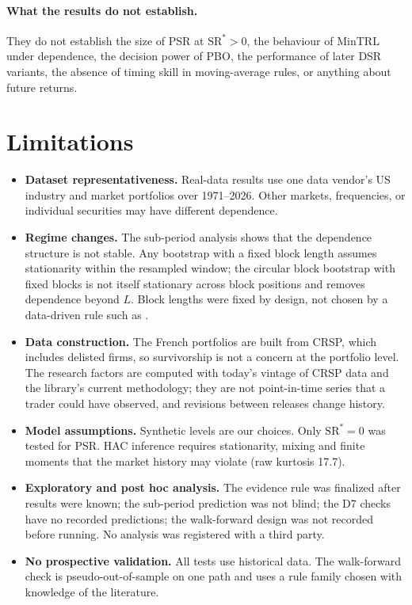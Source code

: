 \documentclass[11pt,a4paper]{article}
\newcommand{\SR}{\mathrm{SR}}
\theoremstyle{remark}
\begin{document}
\paragraph{What the results do not establish.} They do not establish the size of PSR at $\SR^\ast>0$, the behaviour of MinTRL under dependence, the decision power of PBO, the performance of later DSR variants, the absence of timing skill in moving-average rules, or anything about future returns.

\section{Limitations}\label{sec:limits}

\begin{itemize}
\item \textbf{Dataset representativeness.} Real-data results use one data vendor's US industry and market portfolios over 1971--2026. Other markets, frequencies, or individual securities may have different dependence.
\item \textbf{Regime changes.} The sub-period analysis shows that the dependence structure is not stable. Any bootstrap with a fixed block length assumes stationarity within the resampled window; the circular block bootstrap with fixed blocks is not itself stationary across block positions and removes dependence beyond $L$. Block lengths were fixed by design, not chosen by a data-driven rule such as \citet{politis2004}.
\item \textbf{Data construction.} The French portfolios are built from CRSP, which includes delisted firms, so survivorship is not a concern at the portfolio level. The research factors are computed with today's vintage of CRSP data and the library's current methodology; they are not point-in-time series that a trader could have observed, and revisions between releases change history.
\item \textbf{Model assumptions.} Synthetic levels are our choices. Only $\SR^\ast=0$ was tested for PSR. HAC inference requires stationarity, mixing and finite moments that the market history may violate (raw kurtosis 17.7).
\item \textbf{Exploratory and post hoc analysis.} The evidence rule was finalized after results were known; the sub-period prediction was not blind; the D7 checks have no recorded predictions; the walk-forward design was not recorded before running. No analysis was registered with a third party.
\item \textbf{No prospective validation.} All tests use historical data. The walk-forward check is pseudo-out-of-sample on one path and uses a rule family chosen with knowledge of the literature.

\end{itemize}
\end{document}
